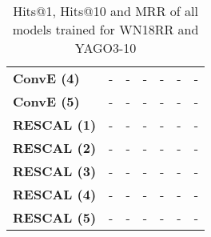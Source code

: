 \begin{table}[]
\begin{tabular}{l|lll|lll}
\textbf{ConvE (4)}   & - & - & - & - & - & -           \\
\textbf{ConvE (5)}   & - & - & - & - & - & -          \\
\textbf{RESCAL (1)}  & - & - & - & - & - & -        \\
\textbf{RESCAL (2)}  & - & - & - & - & - & -       \\
\textbf{RESCAL (3)}  & - & - & - & - & - & -         \\
\textbf{RESCAL (4)}  & - & - & - & - & - & -         \\
\textbf{RESCAL (5)}  & - & - & - & - & - & -        
\end{tabular}
\caption{Hits@1, Hits@10 and MRR of all models trained for WN18RR and YAGO3-10}
\label{tab:metrics_all_wnrr_yago}
\end{table}